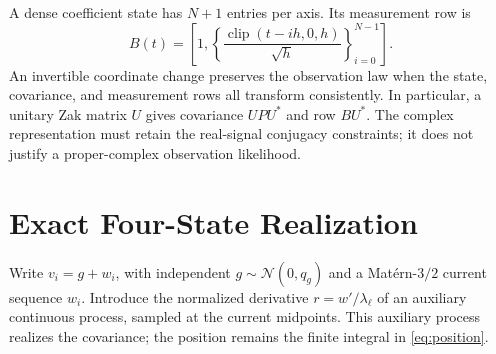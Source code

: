 \documentclass[journal]{IEEEtran}
\newcommand{\Normal}{\mathcal{N}}
\newcommand{\clip}{\operatorname{clip}}
\begin{document}
A dense coefficient state has $N+1$ entries per axis. Its measurement row is
\begin{equation}
 B(t)=\left[1,\left\{\frac{\clip(t-ih,0,h)}{\sqrt h}\right\}_{i=0}^{N-1}\right].
 \label{eq:dense-row}
\end{equation}
An invertible coordinate change preserves the observation law when the
state, covariance, and measurement rows all transform consistently. In
particular, a unitary Zak matrix $U$ gives covariance $UPU^*$ and row
$BU^*$. The complex representation must retain the real-signal conjugacy
constraints; it does not justify a proper-complex observation likelihood.

\section{Exact Four-State Realization}
\label{sec:realization}

Write $v_i=g+w_i$, with independent
$g\sim\Normal(0,q_g)$ and a Mat\'ern-$3/2$ current sequence $w_i$.
Introduce the normalized derivative $r=w'/\lambda_\ell$ of an auxiliary
continuous process, sampled at the current midpoints. This auxiliary
process realizes the covariance; the position remains the finite
integral in \eqref{eq:position}.
\end{document}
